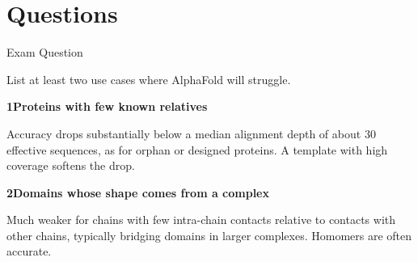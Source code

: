 \documentclass[11pt,aspectratio=169]{beamer}
\gdef\insertslidecitation{}
\newcommand{\reffootnote}[1]{\gdef\insertslidecitation{#1}}
\newcommand{\ck}[1]{[#1]}
\gdef\insertslidecitation{}%
\newcommand{\say}[1]{{\raggedright #1\par}\vspace{2.5mm}}
\begin{document}
\section{Questions}

\begin{frame}[t]{Exam Question}
  \say{List at least two use cases where AlphaFold will struggle.}
  \vspace{1mm}
  {\color{ETHRed}\bfseries 1}\enspace\textbf{Proteins with few known relatives}\par
  \vspace{0.8mm}
  {\raggedright Accuracy drops substantially below a median alignment depth of about 30 effective sequences, as for orphan or designed proteins. A template with high coverage softens the drop.\par}
  \vspace{3mm}
  {\color{ETHRed}\bfseries 2}\enspace\textbf{Domains whose shape comes from a complex}\par
  \vspace{0.8mm}
  {\raggedright Much weaker for chains with few intra-chain contacts relative to contacts with other chains, typically bridging domains in larger complexes. Homomers are often accurate.\par}
  \reffootnote{\ck{JEP+21}, p.~588, Fig.~5a on the limitations slide. Depth: median per-residue $N_{\mathrm{eff}}$, Methods p.~591}
\end{frame}
\end{document}
